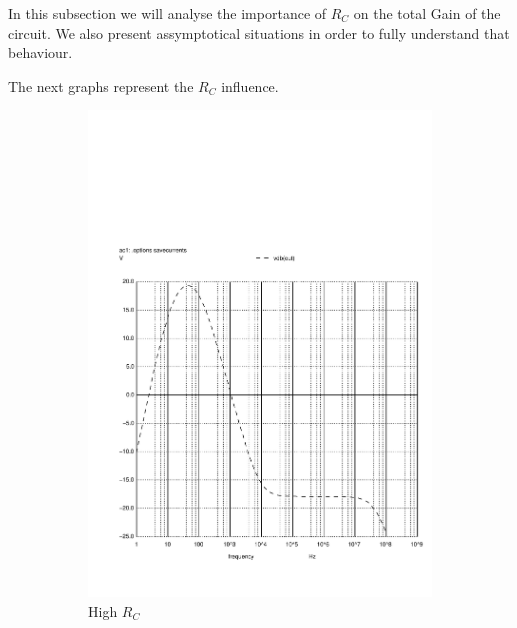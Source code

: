 In this subsection we will analyse the importance of $R_C$ on the total Gain of the circuit.
We also present assymptotical situations in order to fully understand that behaviour.

The next graphs represent the $R_C$ influence.

\begin{figure}[H] 
\centering
\begin{subfigure}{0.3\textwidth}
\includegraphics[width=\textwidth]{rchigh.pdf}
\caption{High $R_C$}
\label{highrc}
\end{subfigure}
\begin{subfigure}{0.3\textwidth}

\end{subfigure}
\end{figure}
